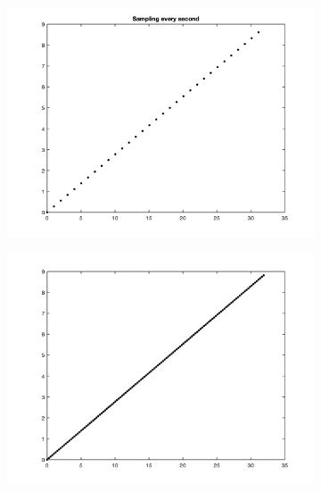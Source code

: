 \documentclass[12pt]{article}
\begin{document}
\begin{figure}[h!]
\centering

\begin{subfigure}{0.49\columnwidth}
\centering
\includegraphics[width=\textwidth]{problem_6_1.png}
\caption{}
\label{fig:time1}
\end{subfigure}\hfill
\begin{subfigure}{0.49\columnwidth}
\centering
\includegraphics[width=\textwidth]{problem_6_2.png}
\caption{}
\label{fig:time2}
\end{subfigure}

\medskip


\end{figure}
\end{document}
